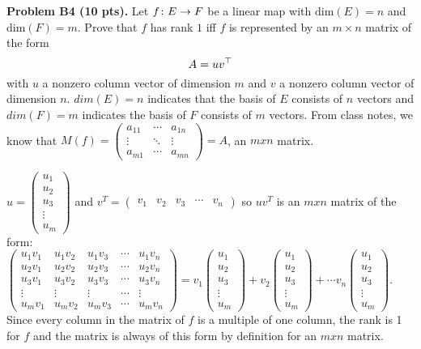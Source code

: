 \documentclass[12pt]{article}
\begin{document}
\vspace {0.25cm}\noindent
{\bf Problem B4 (10 pts).}
Let $f\colon E\rightarrow F$ be a linear map 
with $\mathrm{dim}(E) = n$ and $\mathrm{dim}(F)  = m$.
Prove that $f$ has rank $1$ iff $f$ is represented by an
$m\times n$ matrix of the form
\[
A = uv^{\top}
\]
with $u$ a nonzero column vector of dimension $m$ and $v$ a 
nonzero column vector  of dimension $n$.
$dim(E)=n$ indicates that the basis of $E$ consists of $n$ vectors
and $dim(F)=m$ indicates the basis of $F$ consists of $m$ vectors.
From class notes, we know that $M(f)=\begin{pmatrix}a_{11} & \cdots & a_{1n}\\
\vdots & \ddots & \vdots\\
a_{m1} & \cdots & a_{mn}
\end{pmatrix}=A$, an $mxn$ matrix.

$u=\begin{pmatrix}u_{1}\\
u_{2}\\
u_{3}\\
\vdots\\
u_{m}
\end{pmatrix}$ and $v^{T}=\begin{pmatrix}v_{1} & v_{2} & v_{3} & \cdots & v_{n}\end{pmatrix}$
so $uv^{T}$ is an $mxn$ matrix of the form: $\begin{pmatrix}u_{1}v_{1} & u_{1}v_{2} & u_{1}v_{3} & \cdots & u_{1}v_{n}\\
u_{2}v_{1} & u_{2}v_{2} & u_{2}v_{3} & \cdots & u_{2}v_{n}\\
u_{3}v_{1} & u_{3}v_{2} & u_{3}v_{3} & \cdots & u_{3}v_{n}\\
\vdots & \vdots & \vdots & \cdots & \vdots\\
u_{m}v_{1} & u_{m}v_{2} & u_{m}v_{3} & \cdots & u_{m}v_{n}
\end{pmatrix}=v_{1}\begin{pmatrix}u_{1}\\
u_{2}\\
u_{3}\\
\vdots\\
u_{m}
\end{pmatrix}+v_{2}\begin{pmatrix}u_{1}\\
u_{2}\\
u_{3}\\
\vdots\\
u_{m}
\end{pmatrix}+\cdots v_{n}\begin{pmatrix}u_{1}\\
u_{2}\\
u_{3}\\
\vdots\\
u_{m}
\end{pmatrix}$. Since every column in the matrix of $f$ is a multiple of one column,
the rank is 1 for $f$ and the matrix is always of this form by definition
for an $mxn$ matrix.
\end{document}
